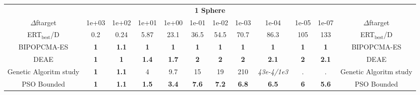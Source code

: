 \begin{tabular}{cccccccccccc}
 & \multicolumn{10}{c}{{\normalsize \textbf{1 Sphere}}}\\
$\Delta$ftarget& 1e+03& 1e+02& 1e+01& 1e+00& 1e-01& 1e-02& 1e-03& 1e-04& 1e-05& 1e-07 & $\Delta$ftarget \\
ERT$_{\textrm{best}}$/D& 0.2& 0.24& 5.87& 23.1& 36.5& 54.5& 70.7& 86.3& 105& 133 & ERT$_{\textrm{best}}$/D \\
\hline
BIPOPCMA-ES & \textbf{1} & \textbf{1.1} & \textbf{1} & \textbf{1} & \textbf{1} & \textbf{1} & \textbf{1} & \textbf{1} & \textbf{1} & \textbf{1} & BIPOPCMA-ES \cite{add_an_entry_for_BIPOPCMA-ES_in_bbob.bib}\\
DEAE & \textbf{1} & \textbf{1} & \textbf{1.4} & \textbf{1.7} & \textbf{2} & \textbf{2} & \textbf{2} & \textbf{2.1} & \textbf{2} & \textbf{2.1} & DEAE \cite{add_an_entry_for_DEAE_in_bbob.bib}\\
Genetic Algoritm study & \textbf{1} & \textbf{1.1} & 4 & 9.7 & 15 & 19 & 210 & \textit{43e-4}\textit{/1e3} & . & . & Genetic Algoritm study \cite{add_an_entry_for_Genetic Algoritm study_in_bbob.bib}\\
PSO Bounded & \textbf{1} & \textbf{1.1} & \textbf{1.5} & \textbf{3.4} & \textbf{7.6} & \textbf{7.2} & \textbf{6.8} & \textbf{6.5} & \textbf{6} & \textbf{5.6} & PSO Bounded \cite{add_an_entry_for_PSO Bounded_in_bbob.bib}
\end{tabular}
